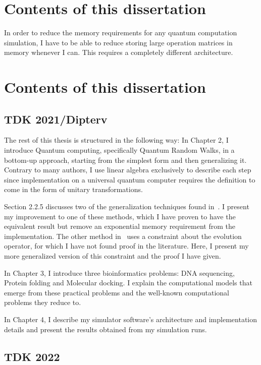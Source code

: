 \section{Contents of this dissertation}

In order to reduce the memory requirements for any quantum computation simulation, I have to be able to reduce storing large operation matrices in memory whenever I can. This requires a completely different architecture.



\section{Contents of this dissertation}

\subsection{TDK 2021/Dipterv}

The rest of this thesis is structured in the following way: In Chapter 2, I introduce Quantum computing, specifically Quantum Random Walks, in a bottom-up approach, starting from the simplest form and then generalizing it. Contrary to many authors, I use linear algebra exclusively to describe each step since implementation on a universal quantum computer requires the definition to come in the form of unitary transformations.

Section 2.2.5 discusses two of the generalization techniques found in~\cite{Portugal}. I present my improvement to one of these methods, which I have proven to have the equivalent result but remove an exponential memory requirement from the implementation. The other method in~\cite{Portugal} uses a constraint about the evolution operator, for which I have not found proof in the literature. Here, I present my more generalized version of this constraint and the proof I have given.

In Chapter 3, I introduce three bioinformatics problems: DNA sequencing, Protein folding and Molecular docking. I explain the computational models that emerge from these practical problems and the well-known computational problems they reduce to.

In Chapter 4, I describe my simulator software's architecture and implementation details and present the results obtained from my simulation runs.

\subsection{TDK 2022}

